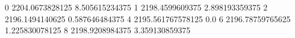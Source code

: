 0 2204.0673828125 8.505615234375
1 2198.4599609375 2.898193359375
2 2196.1494140625 0.587646484375
4 2195.561767578125 0.0
6 2196.78759765625 1.225830078125
8 2198.9208984375 3.359130859375
